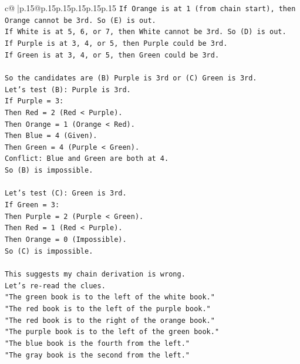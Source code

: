 \documentclass{article}
\begin{document}
{\begin{supertabular}{c@{$\;$}|p{.15\linewidth}@{}p{.15\linewidth}p{.15\linewidth}p{.15\linewidth}p{.15\linewidth}p{.15\linewidth}}
{{{\texttt{If Orange is at 1 (from chain start), then Orange cannot be 3rd. So (E) is out.} \\
\texttt{If White is at 5, 6, or 7, then White cannot be 3rd. So (D) is out.} \\
\texttt{If Purple is at 3, 4, or 5, then Purple could be 3rd.} \\
\texttt{If Green is at 3, 4, or 5, then Green could be 3rd.} \\
\\ 
\texttt{So the candidates are (B) Purple is 3rd or (C) Green is 3rd.} \\
\texttt{Let's test (B): Purple is 3rd.} \\
\texttt{If Purple = 3:} \\
\texttt{Then Red = 2 (Red < Purple).} \\
\texttt{Then Orange = 1 (Orange < Red).} \\
\texttt{Then Blue = 4 (Given).} \\
\texttt{Then Green = 4 (Purple < Green).} \\
\texttt{Conflict: Blue and Green are both at 4.} \\
\texttt{So (B) is impossible.} \\
\\ 
\texttt{Let's test (C): Green is 3rd.} \\
\texttt{If Green = 3:} \\
\texttt{Then Purple = 2 (Purple < Green).} \\
\texttt{Then Red = 1 (Red < Purple).} \\
\texttt{Then Orange = 0 (Impossible).} \\
\texttt{So (C) is impossible.} \\
\\ 
\texttt{This suggests my chain derivation is wrong.} \\
\texttt{Let's re{-}read the clues.} \\
\texttt{"The green book is to the left of the white book."} \\
\texttt{"The red book is to the left of the purple book."} \\
\texttt{"The red book is to the right of the orange book."} \\
\texttt{"The purple book is to the left of the green book."} \\
\texttt{"The blue book is the fourth from the left."} \\
\texttt{"The gray book is the second from the left."} \\
}}}
\end{supertabular}}
\end{document}
